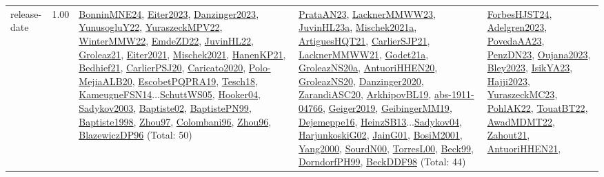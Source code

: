 {\begin{longtable}{p{3cm}r>{\raggedright\arraybackslash}p{6cm}>{\raggedright\arraybackslash}p{6cm}>{\raggedright\arraybackslash}p{8cm}}
\index{release-date}\index{Concepts!release-date}release-date &  1.00 & \hyperref[detail:BonninMNE24]{BonninMNE24}, \hyperref[detail:Eiter2023]{Eiter2023}, \hyperref[detail:Danzinger2023]{Danzinger2023}, \hyperref[detail:YunusogluY22]{YunusogluY22}, \hyperref[detail:YuraszeckMPV22]{YuraszeckMPV22}, \hyperref[detail:WinterMMW22]{WinterMMW22}, \hyperref[detail:EmdeZD22]{EmdeZD22}, \hyperref[detail:JuvinHL22]{JuvinHL22}, \hyperref[detail:Groleaz21]{Groleaz21}, \hyperref[detail:Eiter2021]{Eiter2021}, \hyperref[detail:Mischek2021]{Mischek2021}, \hyperref[detail:HanenKP21]{HanenKP21}, \hyperref[detail:Bedhief21]{Bedhief21}, \hyperref[detail:CarlierPSJ20]{CarlierPSJ20}, \hyperref[detail:Caricato2020]{Caricato2020}, \hyperref[detail:Polo-MejiaALB20]{Polo-MejiaALB20}, \hyperref[detail:EscobetPQPRA19]{EscobetPQPRA19}, \hyperref[detail:Tesch18]{Tesch18}, \hyperref[detail:KameugneFSN14]{KameugneFSN14}...\hyperref[detail:SchuttWS05]{SchuttWS05}, \hyperref[detail:Hooker04]{Hooker04}, \hyperref[detail:Sadykov2003]{Sadykov2003}, \hyperref[detail:Baptiste02]{Baptiste02}, \hyperref[detail:BaptistePN99]{BaptistePN99}, \hyperref[detail:Baptiste1998]{Baptiste1998}, \hyperref[detail:Zhou97]{Zhou97}, \hyperref[detail:Colombani96]{Colombani96}, \hyperref[detail:Zhou96]{Zhou96}, \hyperref[detail:BlazewiczDP96]{BlazewiczDP96} (Total: 50) & \hyperref[detail:PrataAN23]{PrataAN23}, \hyperref[detail:LacknerMMWW23]{LacknerMMWW23}, \hyperref[detail:JuvinHL23a]{JuvinHL23a}, \hyperref[detail:Mischek2021a]{Mischek2021a}, \hyperref[detail:ArtiguesHQT21]{ArtiguesHQT21}, \hyperref[detail:CarlierSJP21]{CarlierSJP21}, \hyperref[detail:LacknerMMWW21]{LacknerMMWW21}, \hyperref[detail:Godet21a]{Godet21a}, \hyperref[detail:GroleazNS20a]{GroleazNS20a}, \hyperref[detail:AntuoriHHEN20]{AntuoriHHEN20}, \hyperref[detail:GroleazNS20]{GroleazNS20}, \hyperref[detail:Danzinger2020]{Danzinger2020}, \hyperref[detail:ZarandiASC20]{ZarandiASC20}, \hyperref[detail:ArkhipovBL19]{ArkhipovBL19}, \hyperref[detail:abs-1911-04766]{abs-1911-04766}, \hyperref[detail:Geiger2019]{Geiger2019}, \hyperref[detail:GeibingerMM19]{GeibingerMM19}, \hyperref[detail:Dejemeppe16]{Dejemeppe16}, \hyperref[detail:HeinzSB13]{HeinzSB13}...\hyperref[detail:Sadykov04]{Sadykov04}, \hyperref[detail:HarjunkoskiG02]{HarjunkoskiG02}, \hyperref[detail:JainG01]{JainG01}, \hyperref[detail:BosiM2001]{BosiM2001}, \hyperref[detail:Yang2000]{Yang2000}, \hyperref[detail:SourdN00]{SourdN00}, \hyperref[detail:TorresL00]{TorresL00}, \hyperref[detail:Beck99]{Beck99}, \hyperref[detail:DorndorfPH99]{DorndorfPH99}, \hyperref[detail:BeckDDF98]{BeckDDF98} (Total: 44) & \hyperref[detail:ForbesHJST24]{ForbesHJST24}, \hyperref[detail:Adelgren2023]{Adelgren2023}, \hyperref[detail:PovedaAA23]{PovedaAA23}, \hyperref[detail:PenzDN23]{PenzDN23}, \hyperref[detail:Oujana2023]{Oujana2023}, \hyperref[detail:Bley2023]{Bley2023}, \hyperref[detail:IsikYA23]{IsikYA23}, \hyperref[detail:Hajji2023]{Hajji2023}, \hyperref[detail:YuraszeckMC23]{YuraszeckMC23}, \hyperref[detail:PohlAK22]{PohlAK22}, \hyperref[detail:TouatBT22]{TouatBT22}, \hyperref[detail:AwadMDMT22]{AwadMDMT22}, \hyperref[detail:Zahout21]{Zahout21}, \hyperref[detail:AntuoriHHEN21]{AntuoriHHEN21}, 
\end{longtable}}
